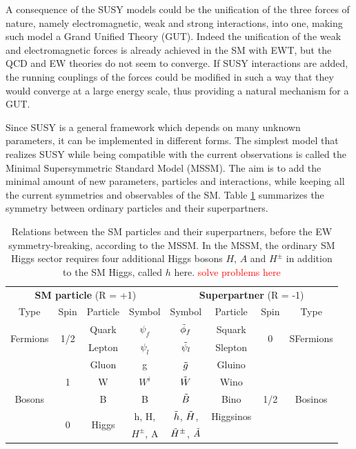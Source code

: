 A consequence of the SUSY models could be the unification of the three forces of nature, namely electromagnetic, weak and strong interactions, into one, making such model a Grand Unified Theory (GUT). Indeed the unification of the weak and electromagnetic forces is already achieved in the SM with EWT, but the QCD and EW theories do not seem to converge. If SUSY interactions are added, the running couplings of the forces could be modified in such a way that they would converge at a large energy scale, thus providing a natural mechanism for a GUT.\newline

Since SUSY is a general framework which depends on many unknown parameters, it can be implemented in different forms. The simplest model that realizes SUSY while being compatible with the current observations is called the Minimal Supersymmetric Standard Model (MSSM). The aim is to add the minimal amount of new parameters, particles and interactions, while keeping all the current symmetries and observables of the SM. Table \ref{tab:superpartners} summarizes the symmetry between ordinary particles and their superpartners.

\begin{table}[]
    \centering
    \begin{tabular}{c c c c | c c c c}
        \hline
         \multicolumn{4}{c}{\textbf{SM particle} (R = +1)} & \multicolumn{4}{c}{\textbf{Superpartner} (R = -1)} \\
        Type & Spin & Particle & Symbol & Symbol & Particle & Spin & Type \\
        \hline
        \multirow{2}{*}{Fermions} & \multirow{2}{*}{1/2} & Quark & $\psi_f$ & $\Tilde{\phi}_f$ & Squark & \multirow{2}{*}{0} & \multirow{2}{*}{SFermions} \\
         & & Lepton & $\psi_l$ & $\Tilde{\psi}_l$ & Slepton & & \\
         \hline
         \multirow{5}{*}{Bosons} & \multirow{3}{*}{1} & Gluon & g & $\Tilde{g}$
   & Gluino & \multirow{5}{*}{1/2} & \multirow{5}{*}{Bosinos} \\
          & & W & $W^i$ & $\Tilde{W}$ & Wino & & \\
          & & B & B & $\Tilde{B}$ & Bino & & \\
          & \multirow{2}{*}{0} & \multirow{2}{*}{Higgs} & h, H, & $\Tilde{h}$, $\Tilde{H}$, & \multicolumn{2}{*}{Higgsinos} & & \\
          & & & $H^{\pm}$, A & $\Tilde{H}^{\pm}$, $\Tilde{A}$ & & & \\ 
          \hline
    \end{tabular}
    \caption{Relations between the SM particles and their superpartners, before the EW symmetry-breaking, according to the MSSM. In the MSSM, the ordinary SM Higgs sector requires four additional Higgs bosons $H$, $A$ and $H^{\pm}$ in addition to the SM Higgs, called $h$ here. \textcolor{red}{solve problems here}}
    \label{tab:superpartners}
\end{table}

